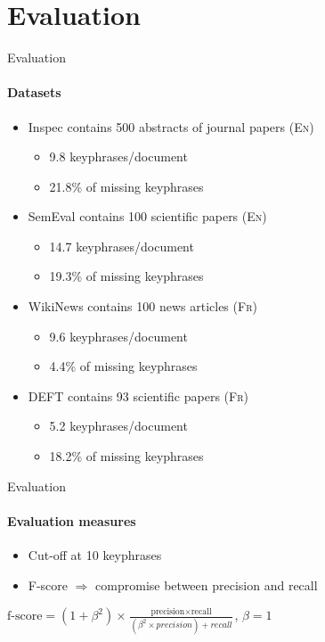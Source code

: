 \section{Evaluation}
  \begin{frame}{Evaluation}
    \framesubtitle{Datasets}

    \begin{itemize}
      \item<+->{Inspec contains 500 abstracts of journal papers ({\small\textsc{En}})}
      \begin{itemize}
        [triangle]
        \item{9.8 keyphrases/document}
        \item{21.8\% of missing keyphrases}
      \end{itemize}
      \item<+->{SemEval contains 100 scientific papers ({\small\textsc{En}})}
      \begin{itemize}
        [triangle]
        \item{14.7 keyphrases/document}
        \item{19.3\% of missing keyphrases}
      \end{itemize}
      \item<+->{WikiNews contains 100 news articles ({\small\textsc{Fr}})}
      \begin{itemize}
        [triangle]
        \item{9.6 keyphrases/document}
        \item{4.4\% of missing keyphrases}
      \end{itemize}
      \item<+->{DEFT contains 93 scientific papers ({\small\textsc{Fr}})}
      \begin{itemize}
        [triangle]
        \item{5.2 keyphrases/document}
        \item{18.2\% of missing keyphrases}
      \end{itemize}
    \end{itemize}
  \end{frame}

  \begin{frame}{Evaluation}
    \framesubtitle{Evaluation measures}

    \begin{itemize}
      \item{Cut-off at 10 keyphrases}
      \item{F-score $\Rightarrow$ compromise between precision and recall}
    \end{itemize}

    \begin{center}
      $\text{f-score} = (1 + \beta^2) \times \frac{\text{precision} \times \text{recall}}{(\beta^2 \times precision) + recall}$,
      $\beta = 1$
    \end{center}
  \end{frame}

